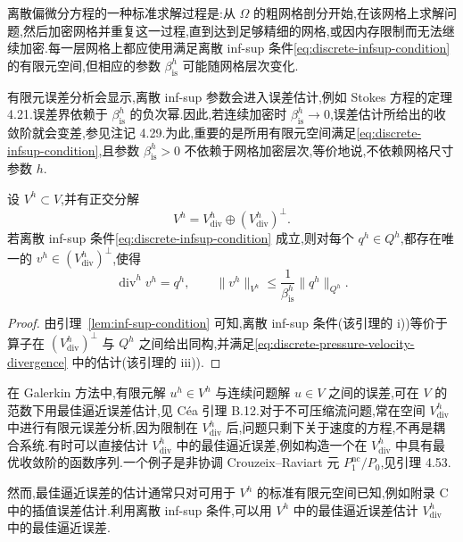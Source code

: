 \begin{note}\label{note:discrete-infsup-parameter}
离散偏微分方程的一种标准求解过程是:从 $\Omega$ 的粗网格剖分开始,在该网格上求解问题,然后加密网格并重复这一过程,直到达到足够精细的网格,或因内存限制而无法继续加密.每一层网格上都应使用满足离散 inf-sup 条件\cref{eq:discrete-infsup-condition} 的有限元空间,但相应的参数 $\beta_{\mathrm{is}}^h$ 可能随网格层次变化.

有限元误差分析会显示,离散 inf-sup 参数会进入误差估计,例如 Stokes 方程的定理 4.21.误差界依赖于 $\beta_{\mathrm{is}}^h$ 的负次幂.因此,若连续加密时 $\beta_{\mathrm{is}}^h\to0$,误差估计所给出的收敛阶就会变差,参见注记 4.29.为此,重要的是所用有限元空间满足\cref{eq:discrete-infsup-condition},且参数 $\beta_{\mathrm{is}}^h>0$ 不依赖于网格加密层次,等价地说,不依赖网格尺寸参数 $h$.
\end{note}

\begin{lemma}[每个离散压力都是某个离散速度的散度]\label{lem:discrete-pressure-is-divergence}
设 $V^h\subset V$,并有正交分解
\[
  V^h=V_{\mathrm{div}}^h\oplus(V_{\mathrm{div}}^h)^{\perp}.
\]
若离散 inf-sup 条件\cref{eq:discrete-infsup-condition} 成立,则对每个 $q^h\in Q^h$,都存在唯一的 $v^h\in(V_{\mathrm{div}}^h)^{\perp}$,使得
\begin{equation}\label{eq:discrete-pressure-velocity-divergence}
  \operatorname{div}^h v^h=q^h,
  \qquad \|v^h\|_{V^h}\le
      \frac1{\beta_{\mathrm{is}}^h}\|q^h\|_{Q^h}.
\end{equation}
\end{lemma}
\begin{proof}
由引理~\ref{lem:inf-sup-condition} 可知,离散 inf-sup 条件(该引理的 i))等价于算子在 $(V_{\mathrm{div}}^h)^{\perp}$ 与 $Q^h$ 之间给出同构,并满足\cref{eq:discrete-pressure-velocity-divergence} 中的估计(该引理的 iii)).
\end{proof}

\begin{note}[最佳逼近误差的重要性]\label{note:best-approximation-error}
在 Galerkin 方法中,有限元解 $u^h\in V^h$ 与连续问题解 $u\in V$ 之间的误差,可在 $V$ 的范数下用最佳逼近误差估计,见 Céa 引理 B.12.对于不可压缩流问题,常在空间 $V_{\mathrm{div}}^h$ 中进行有限元误差分析,因为限制在 $V_{\mathrm{div}}^h$ 后,问题只剩下关于速度的方程,不再是耦合系统.有时可以直接估计 $V_{\mathrm{div}}^h$ 中的最佳逼近误差,例如构造一个在 $V_{\mathrm{div}}^h$ 中具有最优收敛阶的函数序列.一个例子是非协调 Crouzeix--Raviart 元 $P_1^{\mathrm{nc}}/P_0$,见引理 4.53.

然而,最佳逼近误差的估计通常只对可用于 $V^h$ 的标准有限元空间已知,例如附录 C 中的插值误差估计.利用离散 inf-sup 条件,可以用 $V^h$ 中的最佳逼近误差估计 $V_{\mathrm{div}}^h$ 中的最佳逼近误差.
\end{note}

